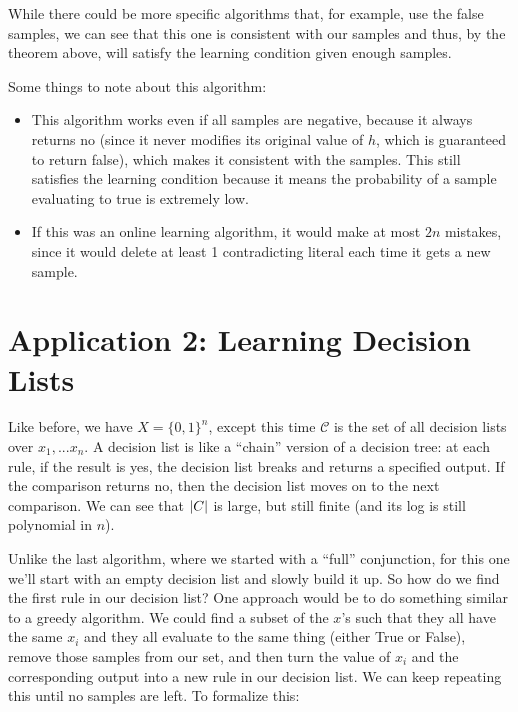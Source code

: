 \documentclass{article}
\DeclarePairedDelimiter\abs{\lvert}{\rvert}
\begin{document}
While there could be more specific algorithms that, for example, use the
false samples, we can see that this one is consistent with our samples
and thus, by the theorem above, will satisfy the learning condition
given enough samples.

Some things to note about this algorithm:
\begin{itemize}
    \item This algorithm works even if all samples are negative,
    because it always returns no (since it never modifies its
    original value of $h$, which is guaranteed to return false),
    which makes it consistent with the samples. This still satisfies
    the learning condition because it means the probability of a
    sample evaluating to true is extremely low.
    \item If this was an online learning algorithm, it would make
    at most $2n$ mistakes, since it would delete at least 1
    contradicting literal each time it gets a new sample.
\end{itemize}

\section{Application 2: Learning Decision Lists}
Like before, we have $X = \{0, 1\}^n$, except this time $\mathcal{C}$
is the set of all decision lists over $x_1, ... x_n$. A decision list
is like a ``chain'' version of a decision tree: at each rule,
if the result is yes, the decision list breaks and returns a specified
output. If the comparison returns no, then the decision list moves on
to the next comparison. We can see that $\abs{C}$ is large, but still
finite (and its log is still polynomial in $n$).

Unlike the last algorithm, where we started with a ``full''
conjunction, for this one we'll start with an empty decision
list and slowly build it up. So how do we find the first
rule in our decision list? One approach would be to do something similar to a
greedy algorithm. We could find a subset of the $x$'s such that they all
have the same $x_i$ and they all evaluate to the same thing (either True or
False), remove those samples from our set, and then turn the value of $x_i$ and
the corresponding output into a new rule in our decision list. We can keep
repeating this until no samples are left. To formalize this:
\end{document}
